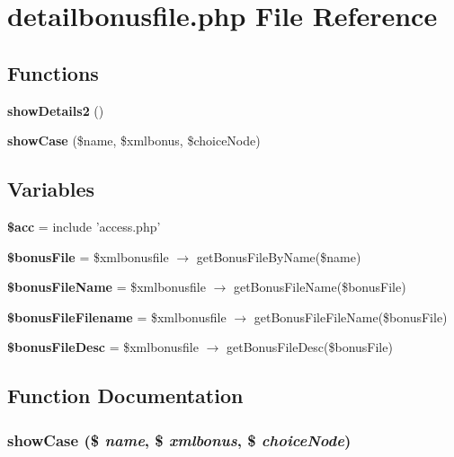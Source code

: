 \section{detailbonusfile.php File Reference}
\label{detailbonusfile_8php}


\subsection*{Functions}
\begin{CompactItemize}
\item 
{\bf show\-Details2} ()
\item 
{\bf show\-Case} (\$name, \$xmlbonus, \$choice\-Node)
\end{CompactItemize}
\subsection*{Variables}
\begin{CompactItemize}
\item 
{\bf \$acc} = include 'access.php'
\item 
{\bf \$bonus\-File} = \$xmlbonusfile $\rightarrow$ get\-Bonus\-File\-By\-Name(\$name)
\item 
{\bf \$bonus\-File\-Name} = \$xmlbonusfile $\rightarrow$ get\-Bonus\-File\-Name(\$bonus\-File)
\item 
{\bf \$bonus\-File\-Filename} = \$xmlbonusfile $\rightarrow$ get\-Bonus\-File\-File\-Name(\$bonus\-File)
\item 
{\bf \$bonus\-File\-Desc} = \$xmlbonusfile $\rightarrow$ get\-Bonus\-File\-Desc(\$bonus\-File)
\end{CompactItemize}


\subsection{Function Documentation}
\subsubsection{\setlength{\rightskip}{0pt plus 5cm}show\-Case (\$ {\em name}, \$ {\em xmlbonus}, \$ {\em choice\-Node})}\label{detailbonusfile_8php_e7055738cd66a1e45c3b909b7798935b}


